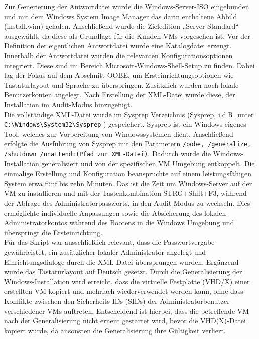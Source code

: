 \documentclass[a4paper,12pt]{article}
\begin{document}
Zur Generierung der Antwortdatei wurde die Windows-Server-ISO eingebunden und mit dem Windows System Image Manager das darin enthaltene Abbild (install.wim) geladen.
Anschließend wurde die Zieledition „Server Standard“ ausgewählt, da diese als Grundlage für die Kunden-VMs vorgesehen ist. Vor der Definition der eigentlichen Antwortdatei wurde eine Katalogdatei erzeugt.
Innerhalb der Antwortdatei wurden die relevanten Konfigurationsoptionen integriert. Diese sind im Bereich Microsoft-Windows-Shell-Setup zu finden.
Dabei lag der Fokus auf dem Abschnitt OOBE, um Ersteinrichtungsoptionen wie Tastaturlayout und Sprache zu überspringen. Zusätzlich wurden noch lokale Benutzerkonten angelegt. 
Nach Erstellung der XML-Datei wurde diese, der Installation im Audit-Modus hinzugefügt.\\

Die vollständige XML-Datei wurde im Sysprep Verzeichnis (Sysprep, i.d.R. unter \verb|C:\Windows\System32\Sysprep|
) gespeichert. Sysprep ist ein Windows eigenes Tool, welches zur Vorbereitung von Windowssystemen dient.
Anschließend erfolgte die Ausführung von Sysprep mit den Parametern \lstinline|/oobe, /generalize, /shutdown /unattend:(Pfad zur XML-Datei)|. 
Dadurch wurde die Windows-Installation generalisiert und von der spezifischen VM Umgebung entkoppelt. 
Die einmalige Erstellung und Konfiguration beanspruchte auf einem leistungsfähigen System etwa fünf bis zehn Minuten.
Das ist die Zeit um Windows-Server auf der VM zu installieren und mit der Tastenkombination STRG+Shift+F3, während der Abfrage des Administratorpassworts, in den Audit-Modus zu wechseln.
Dies ermöglichte individuelle Anpassungen sowie die Absicherung des lokalen Administratorkontos während des Bootens in die Windows Umgebung und überspringt die Ersteinrichtung.\\

Für das Skript war ausschlie\ss lich relevant, dass die Passwortvergabe gewährleistet, ein zusätzlicher lokaler Administrator angelegt und Einrichtungsdialoge durch die XML-Datei übersprungen wurden. Ergänzend wurde das Tastaturlayout auf Deutsch gesetzt.
Durch die Generalisierung der Windows-Installation wird erreicht, dass die virtuelle Festplatte (VHD/X) einer erstellten VM kopiert und mehrfach wiederverwendet werden kann, ohne dass Konflikte zwischen den Sicherheits-IDs (SIDs) der Administratorbenutzer verschiedener VMs auftreten. 
Entscheidend ist hierbei, dass die betreffende VM nach der Generalisierung nicht erneut gestartet wird, bevor die VHD(X)-Datei kopiert wurde, da ansonsten die Generalisierung ihre Gültigkeit verliert.\\
\end{document}
